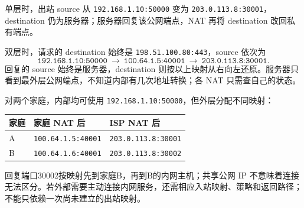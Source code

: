 \begin{workedsolution}
单层时，出站 source 从 \texttt{192.168.1.10:50000} 变为 \texttt{203.0.113.8:30001}，destination 仍为服务器；服务器回复该公网端点，NAT 再将 destination 改回私有端点。

双层时，请求的 destination 始终是 \texttt{198.51.100.80:443}，source 依次为
\[
 \texttt{192.168.1.10:50000}\ \longrightarrow\
 \texttt{100.64.1.5:40001}\ \longrightarrow\
 \texttt{203.0.113.8:30001}.
\]
回复的 source 始终是服务器，destination 则按以上映射从右向左还原。服务器只看到最外层公网端点，不知道内部有几次地址转换；各 NAT 只需查自己的状态。

对两个家庭，内部均可使用 \texttt{192.168.1.10:50000}，但外层分配不同映射：
\begin{center}
\small
\begin{tabular}{@{}lll@{}}
\toprule
家庭 & 家庭 NAT 后 & ISP NAT 后 \\
\midrule
A & \texttt{100.64.1.5:40001} & \texttt{203.0.113.8:30001} \\
B & \texttt{100.64.1.6:40001} & \texttt{203.0.113.8:30002} \\
\bottomrule
\end{tabular}
\end{center}
回复端口30002按映射先到家庭B，再到B的内网主机；共享公网 IP 不意味着连接无法区分。若外部需要主动连接内网服务，还需相应入站映射、策略和返回路径；不能只依赖一次尚未建立的出站映射。
\end{workedsolution}
\endgroup
